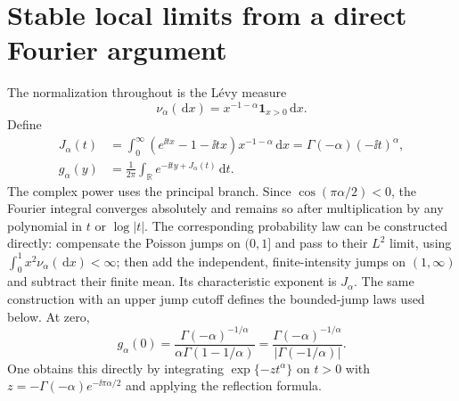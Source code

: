 \documentclass[11pt,a4paper]{article}
\numberwithin{equation}{section}
\theoremstyle{definition}\newtheorem{definition}[theorem]{Definition}
\theoremstyle{remark}\newtheorem{remark}[theorem]{Remark}
\theoremstyle{definition}
\newcommand{\R}{\mathbb R}\newcommand{\C}{\mathbb C}
\newcommand{\dd}{\,\mathrm d}
\begin{document}
\section{Stable local limits from a direct Fourier argument}
\label{sec:local}

The normalization throughout is the L\'evy measure
\begin{equation}\label{eq:levy}
 \nu_\alpha(\dd x)=x^{-1-\alpha}\mathbf1_{x>0}\dd x.
\end{equation}
Define
\begin{align}
 J_\alpha(t)
 &=\int_0^\infty(e^{\ii tx}-1-\ii tx)x^{-1-\alpha}\dd x
   =\Gamma(-\alpha)(-\ii t)^\alpha,\label{eq:J}\\
 g_\alpha(y)&=\frac1{2\pi}\int_\R
              e^{-\ii ty+J_\alpha(t)}\dd t.\label{eq:g}
\end{align}
The complex power uses the principal branch. Since
$\cos(\pi\alpha/2)<0$, the Fourier integral converges absolutely and
remains so after multiplication by any polynomial in $t$ or $\log|t|$.
The corresponding probability law can be constructed directly: compensate
the Poisson jumps on $(0,1]$ and pass to their $L^2$ limit, using
$\int_0^1 x^2\nu_\alpha(\dd x)<\infty$; then add the independent,
finite-intensity jumps on $(1,\infty)$ and subtract their finite mean.
Its characteristic exponent is $J_\alpha$. The same construction with an
upper jump cutoff defines the bounded-jump laws used below.
At zero,
\begin{equation}\label{eq:g0}
 g_\alpha(0)=\frac{\Gamma(-\alpha)^{-1/\alpha}}
 {\alpha\Gamma(1-1/\alpha)}
 =\frac{\Gamma(-\alpha)^{-1/\alpha}}{|\Gamma(-1/\alpha)|}.
\end{equation}
One obtains this directly by integrating
$\exp\{-z t^\alpha\}$ on $t>0$ with
$z=-\Gamma(-\alpha)e^{-\ii\pi\alpha/2}$ and applying the reflection formula.
\end{document}
